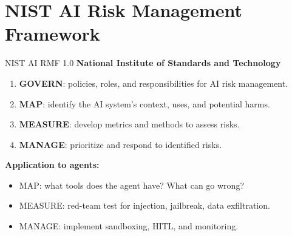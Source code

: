 \documentclass[aspectratio=169,10pt]{beamer}
\begin{document}
\section{NIST AI Risk Management Framework}

\begin{frame}{NIST AI RMF 1.0}
  \textbf{National Institute of Standards and Technology}~\cite{nist2023airm}
  \vspace{0.3em}
  \begin{tcolorbox}[hitbox, title=Four Core Functions]
    \begin{enumerate}
      \item \textbf{GOVERN}: policies, roles, and responsibilities for AI risk management.
      \item \textbf{MAP}: identify the AI system's context, uses, and potential harms.
      \item \textbf{MEASURE}: develop metrics and methods to assess risks.
      \item \textbf{MANAGE}: prioritize and respond to identified risks.
    \end{enumerate}
  \end{tcolorbox}
  \vspace{0.3em}
  \textbf{Application to agents:}
  \begin{itemize}
    \item MAP: what tools does the agent have? What can go wrong?
    \item MEASURE: red-team test for injection, jailbreak, data exfiltration.
    \item MANAGE: implement sandboxing, HITL, and monitoring.
  \end{itemize}
\end{frame}
\end{document}
